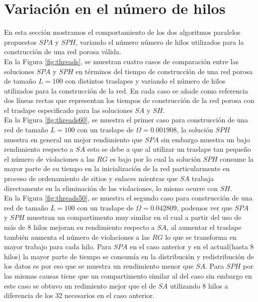 \section*{Variación en el número de hilos}
En esta sección mostramos el comportamiento de los dos algoritmos paralelos propuestos $SPA$ y $SPH$, variando el número número de hilos utilizados para la construcción de una red porosa válida.\\

En la Figura \ref{fig:threads}, se muestran cuatro casos de comparación entre las soluciones $SPA$ y $SPH$ en términos del tiempo de construcción de una red porosa de tamaño $L=100$ con distintos traslapes y variando el número de hilos utilizados para la construcción de la red. En cada caso se añade como referencia dos líneas rectas que representan los tiempos de construcción de la red porosa con el traslape especificado para las soluciones $SA$ y $SH$.\\

En la Figura \ref{fig:threads60}, se muestra el primer caso para construcción de una red de tamaño $L=100$ con un  traslape de $\Omega=0.001908$, la solución $SPH$ muestra en general un mejor rendimiento que $SPA$ sin embargo muestra un bajo rendimiento respecto a $SA$ esto se debe a que al utilizar un traslape tan pequeño el número de violaciones a las $RG$ es bajo por lo cual la solución $SPH$ consume la mayor parte de su tiempo en la inicialización de la red particularmente en proceso de ordenamiento de sitios y enlaces mientras que $SA$ trabaja directamente en la eliminación de las violaciones, lo mismo ocurre con $SH$.\\

En la Figura \ref{fig:threads50}, se muestra el segundo caso para construcción de una red de tamaño $L=100$ con un  traslape de $\Omega=0.042809$, podemos ver que $SPA$ y $SPH$ muestran un compartimento muy similar en el cual a partir del uso de más de 8 hilos mejoran su rendimiento respecto a $SA$, al aumentar el traslape también aumenta el número de violaciones a las $RG$ lo que se transforma en mayor trabajo para cada hilo. Para $SPA$ en el caso anterior y en el actual(hasta 8 hilos) la mayor parte de tiempo se consumía en la distribución y redistribución de los datos es por eso que se muestra un rendimiento menor que $SA$. Para $SPH$ por las mismas causas tiene que un compartimento similar al del caso  sin embargo en este caso se obtuvo un redimiento mejor que el de $SA$ utilizando 8 hilos a diferencia de los 32 necesarios en el caso anterior.\\

